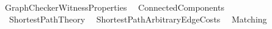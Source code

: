 %
\begin{isabellebody}%
\def\isabellecontext{Graph{\isacharunderscore}Checker{\isacharunderscore}Witness{\isacharunderscore}Properties}%
%
\isadelimtheory
\isanewline
\isanewline
%
\endisadelimtheory
%
\isatagtheory
{}\isamarkupfalse%
\ Graph{\isacharunderscore}Checker{\isacharunderscore}Witness{\isacharunderscore}Properties\isanewline
{}\isanewline
\ \ Connected{\isacharunderscore}Components\isanewline
\ \ Shortest{\isacharunderscore}Path{\isacharunderscore}Theory\isanewline
\ \ Shortest{\isacharunderscore}Path{\isacharunderscore}Arbitrary{\isacharunderscore}Edge{\isacharunderscore}Costs\isanewline
\ \ Matching\isanewline
\isanewline
{}\isanewline
\isanewline
{}\isamarkupfalse%
%
\endisatagtheory
{\isafoldtheory}%
%
\isadelimtheory
%
\endisadelimtheory
\end{isabellebody}%
